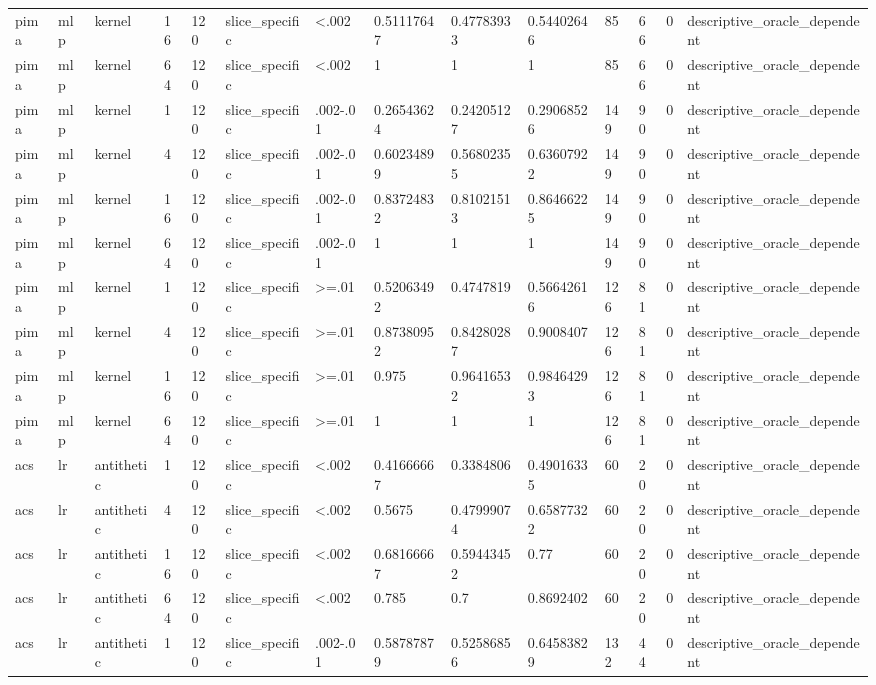 \begin{tabular}{llllllllllllll}
pima & mlp & kernel & 16 & 120 & slice\_specific & <.002 & 0.51117647 & 0.47783933 & 0.54402646 & 85 & 66 & 0 & descriptive\_oracle\_dependent \\
pima & mlp & kernel & 64 & 120 & slice\_specific & <.002 & 1 & 1 & 1 & 85 & 66 & 0 & descriptive\_oracle\_dependent \\
pima & mlp & kernel & 1 & 120 & slice\_specific & .002-.01 & 0.26543624 & 0.24205127 & 0.29068526 & 149 & 90 & 0 & descriptive\_oracle\_dependent \\
pima & mlp & kernel & 4 & 120 & slice\_specific & .002-.01 & 0.60234899 & 0.56802355 & 0.63607922 & 149 & 90 & 0 & descriptive\_oracle\_dependent \\
pima & mlp & kernel & 16 & 120 & slice\_specific & .002-.01 & 0.83724832 & 0.81021513 & 0.86466225 & 149 & 90 & 0 & descriptive\_oracle\_dependent \\
pima & mlp & kernel & 64 & 120 & slice\_specific & .002-.01 & 1 & 1 & 1 & 149 & 90 & 0 & descriptive\_oracle\_dependent \\
pima & mlp & kernel & 1 & 120 & slice\_specific & >=.01 & 0.52063492 & 0.4747819 & 0.56642616 & 126 & 81 & 0 & descriptive\_oracle\_dependent \\
pima & mlp & kernel & 4 & 120 & slice\_specific & >=.01 & 0.87380952 & 0.84280287 & 0.9008407 & 126 & 81 & 0 & descriptive\_oracle\_dependent \\
pima & mlp & kernel & 16 & 120 & slice\_specific & >=.01 & 0.975 & 0.96416532 & 0.98464293 & 126 & 81 & 0 & descriptive\_oracle\_dependent \\
pima & mlp & kernel & 64 & 120 & slice\_specific & >=.01 & 1 & 1 & 1 & 126 & 81 & 0 & descriptive\_oracle\_dependent \\
acs & lr & antithetic & 1 & 120 & slice\_specific & <.002 & 0.41666667 & 0.3384806 & 0.49016335 & 60 & 20 & 0 & descriptive\_oracle\_dependent \\
acs & lr & antithetic & 4 & 120 & slice\_specific & <.002 & 0.5675 & 0.47999074 & 0.65877322 & 60 & 20 & 0 & descriptive\_oracle\_dependent \\
acs & lr & antithetic & 16 & 120 & slice\_specific & <.002 & 0.68166667 & 0.59443452 & 0.77 & 60 & 20 & 0 & descriptive\_oracle\_dependent \\
acs & lr & antithetic & 64 & 120 & slice\_specific & <.002 & 0.785 & 0.7 & 0.8692402 & 60 & 20 & 0 & descriptive\_oracle\_dependent \\
acs & lr & antithetic & 1 & 120 & slice\_specific & .002-.01 & 0.58787879 & 0.52586856 & 0.64583829 & 132 & 44 & 0 & descriptive\_oracle\_dependent \\

\end{tabular}
